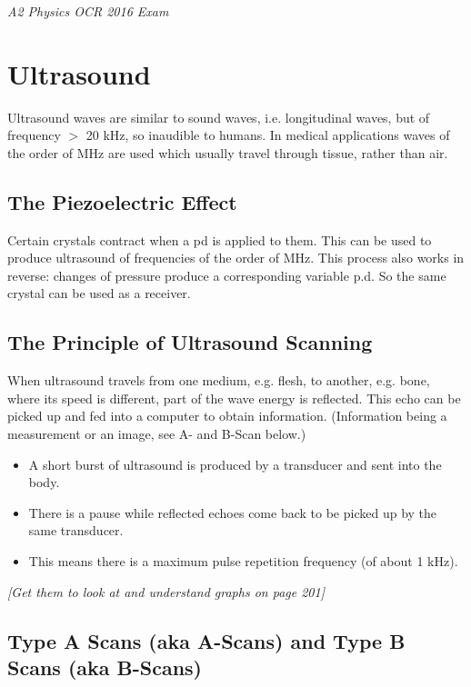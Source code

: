 \documentclass{article}
\begin{document}
\textit{A2 Physics OCR 2016 Exam}\\
\section*{Ultrasound}

Ultrasound waves are similar to sound waves, i.e. longitudinal waves, but of frequency $>$ 20 kHz, so inaudible to humans. In medical applications waves of the order of MHz are used which usually travel through tissue, rather than air.


\subsection*{The Piezoelectric Effect}

Certain crystals contract when a pd is applied to them. This can be used to produce ultrasound of frequencies of the order of MHz.
This process also works in reverse: changes of pressure produce a corresponding variable p.d. So the same crystal can be used as a receiver.


\subsection*{The Principle of Ultrasound Scanning}

When ultrasound travels from one medium, e.g. flesh, to another, e.g. bone, where its speed is different, part of the wave energy is reflected. This echo can be picked up and fed into a computer to obtain information. (Information being a measurement or an image, see A- and B-Scan below.)

\begin{itemize}
\item{A short burst of ultrasound is produced by a transducer and sent into the body.}
\item{There is a pause while reflected echoes come back to be picked up by the same transducer.}
\item{This means there is a maximum pulse repetition frequency (of about 1 kHz).}
\end{itemize}
\scriptsize{\textit{[Get them to look at and understand graphs on page 201]}}\\
\normalsize

\subsection*{Type A Scans (aka A-Scans) and Type B Scans (aka B-Scans)}
\end{document}
